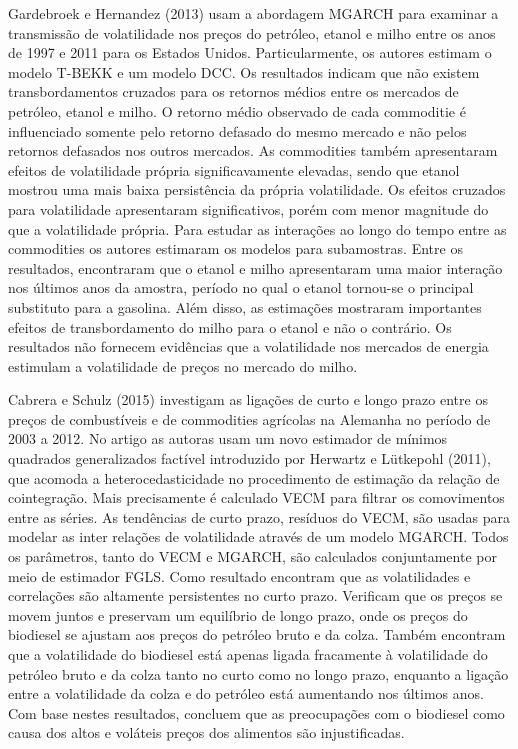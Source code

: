 \documentclass[a4paper,12pt] {article}
\begin{document}
	Gardebroek e Hernandez (2013) usam a abordagem MGARCH para examinar a transmissão de volatilidade nos preços do petróleo, etanol e milho entre os anos de 1997 e 2011 para os Estados Unidos.  Particularmente, os autores estimam o modelo T-BEKK e um modelo DCC. Os resultados indicam que não existem transbordamentos cruzados para os retornos médios entre os   mercados de petróleo, etanol e milho. O retorno médio observado de cada commoditie é influenciado somente pelo retorno defasado do mesmo mercado e não pelos retornos defasados nos outros mercados. As commodities também apresentaram efeitos de volatilidade própria significavamente elevadas, sendo que etanol mostrou uma mais baixa persistência da própria volatilidade. Os efeitos cruzados para volatilidade apresentaram significativos, porém com menor magnitude do que a volatilidade própria. Para estudar as interações ao longo do tempo entre as commodities os autores estimaram os modelos para subamostras. Entre os resultados, encontraram  que o etanol e milho apresentaram uma maior interação nos últimos anos da amostra, período no qual o etanol tornou-se o principal substituto para a gasolina. Além disso, as estimações mostraram importantes efeitos de transbordamento do milho para o etanol e não o contrário.  Os resultados não fornecem evidências que a volatilidade nos mercados de energia estimulam a volatilidade de preços no mercado do milho. 
	
	Cabrera e Schulz (2015) investigam as ligações de curto e longo prazo entre os preços de combustíveis e de commodities agrícolas na Alemanha no período de 2003 a 2012. No artigo as autoras usam um novo estimador de mínimos quadrados generalizados  factível  introduzido por Herwartz e Lütkepohl (2011), que acomoda a heterocedasticidade no procedimento de estimação da relação de cointegração. Mais precisamente é calculado VECM para filtrar os comovimentos entre as séries. As tendências de curto prazo, resíduos do VECM, são usadas para modelar as inter relações de volatilidade através de um modelo MGARCH. Todos os parâmetros, tanto do VECM e MGARCH, são calculados conjuntamente por meio de estimador FGLS. Como resultado encontram que as volatilidades e correlações são altamente persistentes no curto prazo. Verificam que os preços se movem juntos e preservam um equilíbrio de longo prazo,  onde os preços do biodiesel se ajustam aos preços do petróleo bruto e da colza. Também encontram que a volatilidade do biodiesel está apenas ligada fracamente à volatilidade do petróleo bruto e da colza tanto no curto como no longo prazo, enquanto a ligação entre a volatilidade da colza e do petróleo  está aumentando nos últimos anos. Com base nestes resultados, concluem que as preocupações com o biodiesel como causa dos altos e voláteis  preços dos alimentos são  injustificadas.
	
\end{document}
